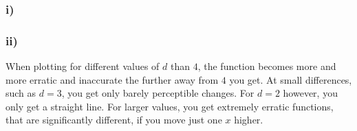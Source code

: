 \subsubsection{i)}
\subsubsection{ii)}
When plotting for different values of $d$ than $4$, the function becomes more and more erratic and inaccurate the further away from $4$ you get. At small differences, such as $d=3$, you get only barely perceptible changes. For $d=2$ however, you only get a straight line. For larger values, you get extremely erratic functions, that are significantly different, if you move just one $x$ higher.
